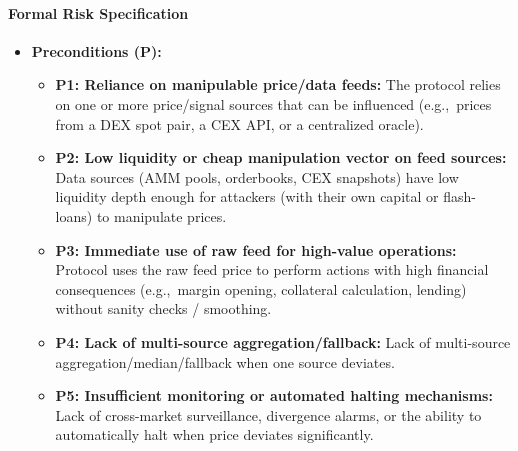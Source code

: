 \paragraph{Formal Risk Specification}

\begin{itemize}
    \item \textbf{Preconditions (P):}
        \begin{itemize}
            \item \textbf{P1: Reliance on manipulable price/data feeds:} The protocol relies on one or more price/signal sources that can be influenced (e.g.,\ prices from a DEX spot pair, a CEX API, or a centralized oracle). \cite{chainalysis2023oracle}
            \item \textbf{P2: Low liquidity or cheap manipulation vector on feed sources:} Data sources (AMM pools, orderbooks, CEX snapshots) have low liquidity depth enough for attackers (with their own capital or flash-loans) to manipulate prices. \cite{kessler2022exploit}
            \item \textbf{P3: Immediate use of raw feed for high-value operations:} Protocol uses the raw feed price to perform actions with high financial consequences (e.g.,\ margin opening, collateral calculation, lending) without sanity checks / smoothing. \cite{chainlink2021defi}
            \item \textbf{P4: Lack of multi-source aggregation/fallback:} Lack of multi-source aggregation/median/fallback when one source deviates. \cite{chainlink2021defi}
            \item \textbf{P5: Insufficient monitoring or automated halting mechanisms:} Lack of cross-market surveillance, divergence alarms, or the ability to automatically halt when price deviates significantly. \cite{chainalysis2023oracle}
        \end{itemize}


\end{itemize}
